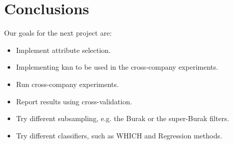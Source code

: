 \documentclass{sig-alternate}
\begin{document}
\section{Conclusions}
Our goals for the next project are:
\begin{itemize}
\item{Implement attribute selection.}
\item{Implementing knn to be used in the cross-company experiments.}
\item{Run cross-company experiments.}
\item{Report results using cross-validation.}
\item{Try different subsampling, e.g. the Burak or the super-Burak filters.}
\item{Try different classifiers, such as WHICH and Regression methods.}
\end{itemize}


%
%

\end{document}
